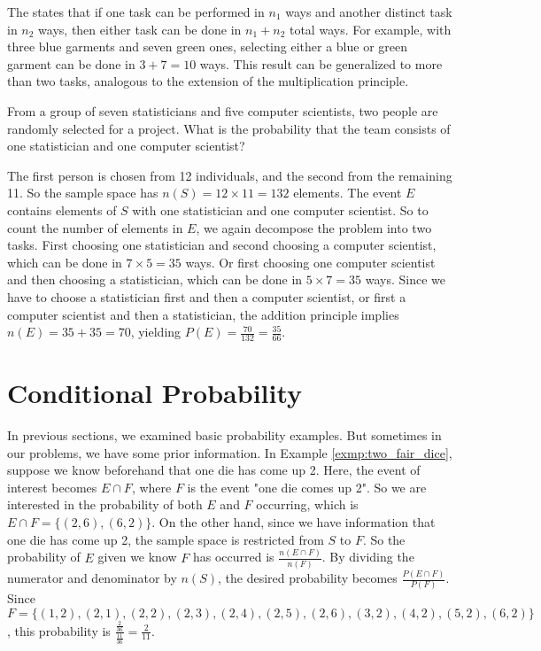 The  states that if one task can be performed in \( n_1 \) ways and another distinct task in \( n_2 \) ways,
then either task can be done in \( n_1 + n_2 \) total ways.
For example, with three blue garments and seven green ones,
selecting either a blue or green garment can be done in \( 3 + 7 = 10 \) ways.
This result can be generalized to more than two tasks, analogous to the extension of the multiplication principle.

\begin{exmp}
	From a group of seven statisticians and five computer scientists, two people are randomly selected for a project.
	What is the probability that the team consists of one statistician and one computer scientist?
\end{exmp}
\begin{solution}
	The first person is chosen from 12 individuals, and the second from the remaining 11.
	So the sample space has \( n(S) = 12 \times 11 = 132 \) elements.
	The event \( E \) contains elements of \( S \) with one statistician and one computer scientist.
	So to count the number of elements in \( E \), we again decompose the problem into two tasks.
	First choosing one statistician and second choosing a computer scientist,
	which can be done in \( 7 \times 5 = 35 \) ways.
	Or first choosing one computer scientist and then choosing a statistician,
	which can be done in \( 5 \times 7 = 35 \) ways.
	Since we have to choose a statistician first and then a computer scientist, or first a computer scientist and then a statistician,
	the addition principle implies \( n(E) = 35 + 35 = 70 \), yielding \( P(E) = \frac{70}{132} = \frac{35}{66} \).
\end{solution}

\section{Conditional Probability}

In previous sections, we examined basic probability examples.
But sometimes in our problems, we have some prior information.
In Example \autoref{exmp:two_fair_dice}, suppose we know beforehand that one die has come up 2.
Here, the event of interest becomes \( E \cap F \), where \( F \) is the event "one die comes up 2".
So we are interested in the probability of both \( E \) and \( F \) occurring, which is \( E \cap F = \{ (2, 6), (6, 2) \} \).
On the other hand, since we have information that one die has come up 2, the sample space is restricted from \( S \) to \( F \).
So the probability of \( E \) given we know \( F \) has occurred is \( \frac{n(E \cap F)}{n(F)} \).
By dividing the numerator and denominator by \( n(S) \), the desired probability becomes \( \frac{P(E \cap F)}{P(F)} \).
Since \( F = \{ (1, 2), (2, 1), (2, 2), (2, 3), (2, 4), (2, 5), (2, 6), (3, 2), (4, 2), (5, 2), (6, 2) \} \),
this probability is \( \frac{\frac{2}{36}}{\frac{11}{36}} = \frac{2}{11} \).

